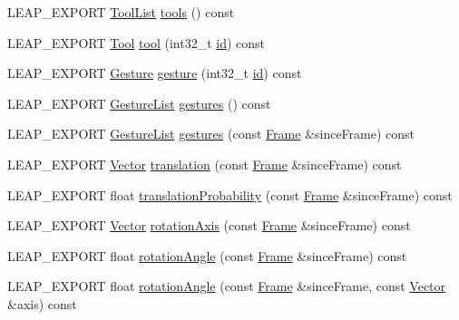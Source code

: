 \begin{DoxyCompactItemize}
L\+E\+A\+P\+\_\+\+E\+X\+P\+O\+R\+T \hyperlink{class_leap_1_1_tool_list}{Tool\+List} \hyperlink{class_leap_1_1_frame_abf81ff857abdd1cc9c2ccb889eb1c6e3}{tools} () const 
\item 
L\+E\+A\+P\+\_\+\+E\+X\+P\+O\+R\+T \hyperlink{class_leap_1_1_tool}{Tool} \hyperlink{class_leap_1_1_frame_aa12947e61dbbf470d4ee4906c7928f08}{tool} (int32\+\_\+t \hyperlink{class_leap_1_1_frame_aaa0ab37b441f635a293f577dc9b2d20f}{id}) const 
\item 
L\+E\+A\+P\+\_\+\+E\+X\+P\+O\+R\+T \hyperlink{class_leap_1_1_gesture}{Gesture} \hyperlink{class_leap_1_1_frame_afb0577b99e3bc259c4e20a710062c926}{gesture} (int32\+\_\+t \hyperlink{class_leap_1_1_frame_aaa0ab37b441f635a293f577dc9b2d20f}{id}) const 
\item 
L\+E\+A\+P\+\_\+\+E\+X\+P\+O\+R\+T \hyperlink{class_leap_1_1_gesture_list}{Gesture\+List} \hyperlink{class_leap_1_1_frame_a4e4dfb7dbe7796d836fdbec255909379}{gestures} () const 
\item 
L\+E\+A\+P\+\_\+\+E\+X\+P\+O\+R\+T \hyperlink{class_leap_1_1_gesture_list}{Gesture\+List} \hyperlink{class_leap_1_1_frame_a5e85715286974e35d5ea557da19aafbb}{gestures} (const \hyperlink{class_leap_1_1_frame}{Frame} \&since\+Frame) const 
\item 
L\+E\+A\+P\+\_\+\+E\+X\+P\+O\+R\+T \hyperlink{struct_leap_1_1_vector}{Vector} \hyperlink{class_leap_1_1_frame_a086cdc5e4d525590c553c2c250e04458}{translation} (const \hyperlink{class_leap_1_1_frame}{Frame} \&since\+Frame) const 
\item 
L\+E\+A\+P\+\_\+\+E\+X\+P\+O\+R\+T float \hyperlink{class_leap_1_1_frame_a2aa8c89a3d9a16fa6a674e95ecd9e31f}{translation\+Probability} (const \hyperlink{class_leap_1_1_frame}{Frame} \&since\+Frame) const 
\item 
L\+E\+A\+P\+\_\+\+E\+X\+P\+O\+R\+T \hyperlink{struct_leap_1_1_vector}{Vector} \hyperlink{class_leap_1_1_frame_a40411646c821ded2c1a1604d63ccba29}{rotation\+Axis} (const \hyperlink{class_leap_1_1_frame}{Frame} \&since\+Frame) const 
\item 
L\+E\+A\+P\+\_\+\+E\+X\+P\+O\+R\+T float \hyperlink{class_leap_1_1_frame_ac7ea6b9924b093854a5aef00b5f4ec94}{rotation\+Angle} (const \hyperlink{class_leap_1_1_frame}{Frame} \&since\+Frame) const 
\item 
L\+E\+A\+P\+\_\+\+E\+X\+P\+O\+R\+T float \hyperlink{class_leap_1_1_frame_a0a280ad7f99d52ee08c4ae99362fce62}{rotation\+Angle} (const \hyperlink{class_leap_1_1_frame}{Frame} \&since\+Frame, const \hyperlink{struct_leap_1_1_vector}{Vector} \&axis) const 

\end{DoxyCompactItemize}
